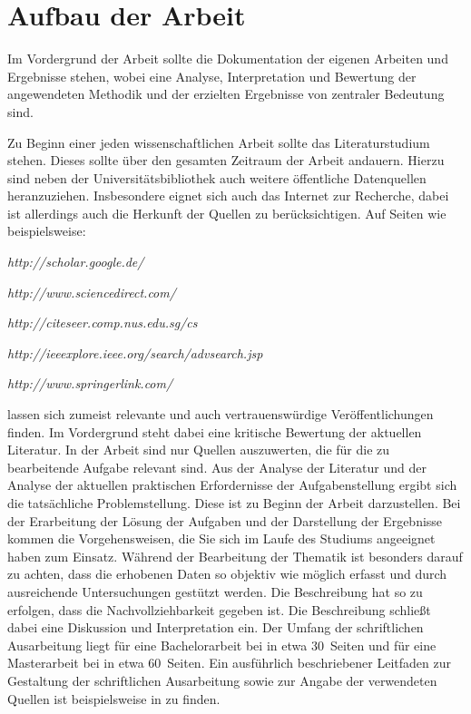 \chapter{Aufbau der Arbeit}
\label{aufbau}

Im Vordergrund der Arbeit sollte die Dokumentation der eigenen
Arbeiten und Ergebnisse stehen, wobei eine Analyse, Interpretation
und Bewertung der angewendeten Methodik und der erzielten
Ergebnisse von zentraler Bedeutung sind.

\sloppy
Zu Beginn einer jeden wissenschaftlichen Arbeit sollte das
Literaturstudium stehen. Dieses sollte über den gesamten Zeitraum
der Arbeit andauern. Hierzu sind neben der Universitätsbibliothek
auch weitere öffentliche Datenquellen heranzuziehen. Insbesondere
eignet sich auch das Internet zur Recherche, dabei ist allerdings
auch die Herkunft der Quellen zu berücksichtigen. Auf Seiten wie
beispielsweise:

\emph{http://scholar.google.de/}

\emph{http://www.sciencedirect.com/}

\emph{http://citeseer.comp.nus.edu.sg/cs}

\emph{http://ieeexplore.ieee.org/search/advsearch.jsp}

\emph{http://www.springerlink.com/}

lassen sich zumeist relevante und auch vertrauenswürdige
Veröffentlichungen finden. Im Vordergrund steht dabei eine
kritische Bewertung der aktuellen Literatur. In der Arbeit sind
nur Quellen auszuwerten, die für die zu bearbeitende Aufgabe
relevant sind. Aus der Analyse der Literatur und der Analyse der
aktuellen praktischen Erfordernisse der Aufgabenstellung ergibt
sich die tatsächliche Problemstellung. Diese ist zu Beginn der
Arbeit darzustellen. Bei der Erarbeitung der Lösung der Aufgaben
und der Darstellung der Ergebnisse kommen die Vorgehensweisen, die
Sie sich im Laufe des Studiums angeeignet haben zum Einsatz.
Während der Bearbeitung der Thematik ist besonders darauf zu
achten, dass die erhobenen Daten so objektiv wie möglich erfasst
und durch ausreichende Untersuchungen gestützt werden. Die
Beschreibung hat so zu erfolgen, dass die Nachvollziehbarkeit
gegeben ist. Die Beschreibung schließt dabei eine Diskussion und
Interpretation ein. Der Umfang der schriftlichen Ausarbeitung
liegt für eine Bachelorarbeit bei in etwa 30~Seiten und für eine
Masterarbeit bei in etwa 60~Seiten. Ein ausführlich
beschriebener Leitfaden zur Gestaltung der schriftlichen
Ausarbeitung sowie zur Angabe der verwendeten Quellen ist
beispielsweise in \textcite{Leit1} zu finden.

